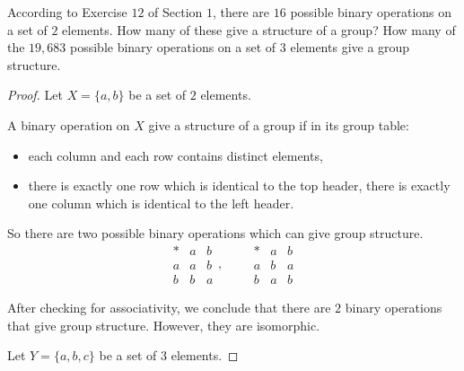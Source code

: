 \newpage
\begin{exercise}
    According to Exercise $12$ of Section $1$, there are $16$ possible binary operations on a set of $2$ elements. How many of these give a structure of a group? How many of the $19,683$ possible binary operations on a set of $3$ elements give a group structure.
\end{exercise}

\begin{proof}
    Let $X = \{ a, b \}$ be a set of $2$ elements.

    A binary operation on $X$ give a structure of a group if in its group table:
    \begin{itemize}
        \item each column and each row contains distinct elements,
        \item there is exactly one row which is identical to the top header, there is exactly one column which is identical to the left header.
    \end{itemize}

    So there are two possible binary operations which can give group structure.
    \[
        \begin{array}{c|cc}
            * & a & b \\
            \hline
            a & a & b \\
            b & b & a
        \end{array},\qquad
        \begin{array}{c|cc}
            * & a & b \\
            \hline
            a & b & a \\
            b & a & b
        \end{array}
    \]

    After checking for associativity, we conclude that there are $2$ binary operations that give group structure. However, they are isomorphic.

    Let $Y = \{ a, b, c \}$ be a set of $3$ elements.


\end{proof}
